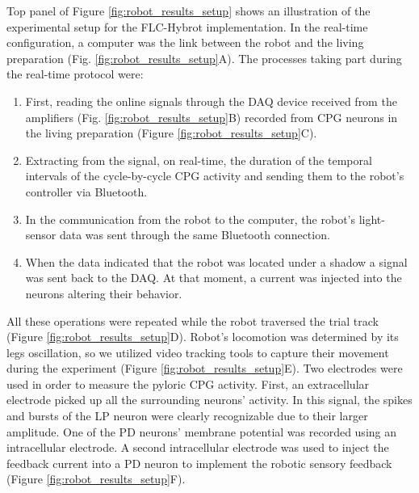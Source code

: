 Top panel of Figure \ref{fig:robot_results_setup} shows an illustration of the experimental setup for the FLC-Hybrot implementation. In the real-time configuration, a computer was the link between the robot and the living preparation (Fig. \ref{fig:robot_results_setup}A). The processes taking part during the real-time protocol were:
\begin{enumerate}
	\item First, reading the online signals through the DAQ device received from the amplifiers (Fig. \ref{fig:robot_results_setup}B) recorded from CPG neurons in the living preparation (Figure \ref{fig:robot_results_setup}C).
	\item Extracting from the signal, on real-time, the duration of the temporal intervals of the cycle-by-cycle CPG activity and sending them to the robot's controller via Bluetooth.
	\item In the communication from the robot to the computer, the robot's light-sensor data was sent through the same Bluetooth connection.
	\item When the data indicated that the robot was located under a shadow a signal was sent back to the DAQ. At that moment, a current was injected into the neurons altering their behavior.
\end{enumerate}

All these operations were repeated while the robot traversed the trial track (Figure \ref{fig:robot_results_setup}D). Robot's locomotion was determined by its legs oscillation, so we utilized video tracking tools to capture their movement during the experiment (Figure \ref{fig:robot_results_setup}E). Two electrodes were used in order to measure the pyloric CPG activity. First, an extracellular electrode picked up all the surrounding neurons' activity. In this signal, the spikes and bursts of the LP neuron were clearly recognizable due to their larger amplitude. One of the PD neurons' membrane potential was recorded using an intracellular electrode. A second intracellular electrode was used to inject the feedback current into a PD neuron to implement the robotic sensory feedback (Figure \ref{fig:robot_results_setup}F).

